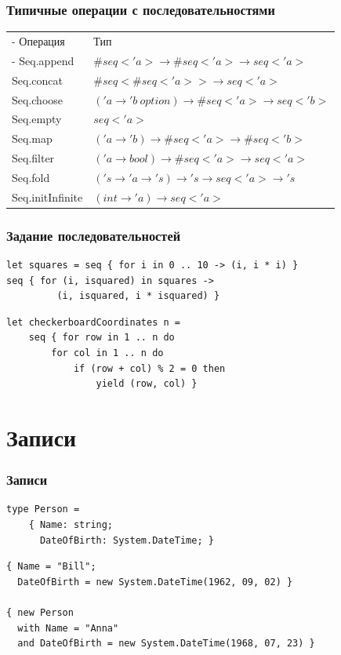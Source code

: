 \documentclass[xetex,mathserif,serif]{beamer}
\begin{document}
	\begin{frame}
		\frametitle{Типичные операции с последовательностями}
		\begin{small}
			\begin{tabu} {| X[0.5 l p] | X[1 l p] |}
				\tabucline-
				Операция                               & Тип                    \\
				\tabucline-
				\everyrow{\tabucline-}
				Seq.append                    & $\#seq<'a> \to \#seq<'a> \to seq<'a>$ \\
				Seq.concat                    & $\#seq<\#seq<'a>> \to seq<'a>$ \\
				Seq.choose                    & $('a \to 'b\ option) \to \#seq<'a> \to seq<'b>$ \\
				Seq.empty                     & $seq<'a>$ \\
				Seq.map                       & $('a \to 'b) \to \#seq<'a> \to \#seq<'b>$ \\
				Seq.filter                    & $('a \to bool) \to \#seq<'a> \to seq<'a>$ \\
				Seq.fold                      & $('s \to 'a \to 's) \to 's \to seq<'a> \to 's$ \\
				Seq.initInfinite              & $(int \to 'a) \to seq<'a>$ \\
			\end{tabu}
		\end{small}
	\end{frame}

	\begin{frame}[fragile]
		\frametitle{Задание последовательностей}
		\begin{verbatim}
let squares = seq { for i in 0 .. 10 -> (i, i * i) }
seq { for (i, isquared) in squares -> 
         (i, isquared, i * isquared) }
		\end{verbatim}

		\begin{verbatim}
let checkerboardCoordinates n =
    seq { for row in 1 .. n do
        for col in 1 .. n do
            if (row + col) % 2 = 0 then
                yield (row, col) }
		\end{verbatim}
\end{frame}

	\section{Записи}
	
	\begin{frame}[fragile]
		\frametitle{Записи}
		\begin{verbatim}
type Person =
    { Name: string;
      DateOfBirth: System.DateTime; }
		\end{verbatim}

		\begin{verbatim}
{ Name = "Bill"; 
  DateOfBirth = new System.DateTime(1962, 09, 02) }

{ new Person
  with Name = "Anna"
  and DateOfBirth = new System.DateTime(1968, 07, 23) }
		\end{verbatim}
\end{frame}
\end{document}
